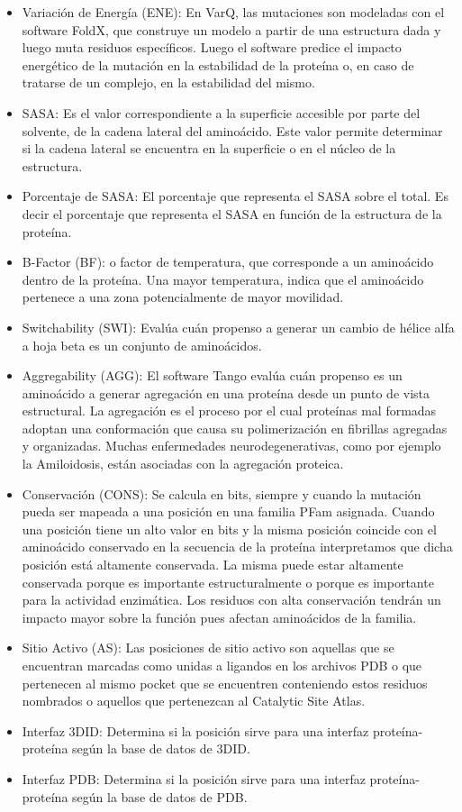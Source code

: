 \begin{itemize}
    \item Variación de Energía (ENE): En VarQ, las mutaciones son modeladas con el software FoldX, que construye un modelo a partir de una estructura dada y luego muta residuos específicos. Luego el software predice el impacto energético de la mutación en la estabilidad de la proteína o, en caso de tratarse de un complejo, en la estabilidad del mismo.
    \item SASA: Es el valor correspondiente a la superficie accesible por parte del solvente, de la cadena lateral del aminoácido. Este valor permite determinar si la cadena lateral se encuentra en la superficie o en el núcleo de la estructura.
    \item Porcentaje de SASA: El porcentaje que representa el SASA sobre el total. Es decir el porcentaje que representa el SASA en función de la estructura de la proteína.
    \item B-Factor (BF): o factor de temperatura, que corresponde a un aminoácido dentro de la proteína. Una mayor temperatura, indica que el aminoácido pertenece a una zona potencialmente de mayor movilidad.
    \item Switchability (SWI): Evalúa cuán propenso a generar un cambio de hélice alfa a hoja beta es un conjunto de aminoácidos.
    \item Aggregability (AGG): El software Tango evalúa cuán
    propenso es un aminoácido a generar agregación en una proteína desde un punto de vista estructural. La agregación es el proceso por el cual proteínas mal formadas
    adoptan una conformación que causa su polimerización en fibrillas agregadas y organizadas. Muchas enfermedades neurodegenerativas, como por ejemplo la Amiloidosis, están asociadas con la agregación proteica.
    \item Conservación (CONS): Se calcula en bits, siempre y cuando la mutación pueda ser mapeada a una posición en una familia PFam asignada. Cuando una posición tiene un alto valor en bits y la misma posición coincide con el aminoácido conservado en la secuencia de la proteína interpretamos que dicha posición está altamente conservada. La misma puede estar altamente conservada porque es importante estructuralmente o porque es importante para la actividad enzimática. Los residuos con alta conservación tendrán un impacto mayor sobre la función pues afectan aminoácidos de la familia.
    \item Sitio Activo (AS): Las posiciones de sitio activo son aquellas que se encuentran marcadas como unidas a ligandos en los archivos PDB o que pertenecen al mismo pocket que se encuentren conteniendo estos residuos nombrados o aquellos que pertenezcan al Catalytic Site Atlas.
    \item Interfaz 3DID: Determina si la posición sirve para una interfaz proteína-proteína según la base de datos de 3DID.
    \item Interfaz PDB: Determina si la posición sirve para una interfaz proteína-proteína según la base de datos de PDB.
\end{itemize}


